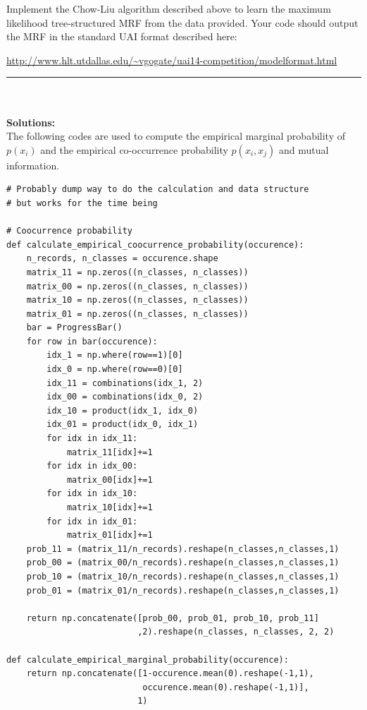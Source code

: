 \documentclass{article}
\begin{document}
\begin{enumerate}

Implement the Chow-Liu algorithm described above to learn the maximum
likelihood tree-structured MRF from the data provided. Your code should output the MRF in the standard UAI format described here:
\begin{center}
\url{http://www.hlt.utdallas.edu/~vgogate/uai14-competition/modelformat.html}
\end{center}
\noindent\rule{14cm}{2pt}
\\
\\
\textbf{Solutions:}
\\
The following codes are used to compute the empirical marginal probability of $p(x_i)$ and the empirical co-occurrence probability  $p(x_i, x_j)$ and mutual information.
\begin{verbatim}
# Probably dump way to do the calculation and data structure
# but works for the time being

# Coocurrence probability
def calculate_empirical_coocurrence_probability(occurence):
    n_records, n_classes = occurence.shape
    matrix_11 = np.zeros((n_classes, n_classes))
    matrix_00 = np.zeros((n_classes, n_classes))
    matrix_10 = np.zeros((n_classes, n_classes))
    matrix_01 = np.zeros((n_classes, n_classes))
    bar = ProgressBar()
    for row in bar(occurence):
        idx_1 = np.where(row==1)[0]
        idx_0 = np.where(row==0)[0]
        idx_11 = combinations(idx_1, 2)
        idx_00 = combinations(idx_0, 2)
        idx_10 = product(idx_1, idx_0)
        idx_01 = product(idx_0, idx_1)
        for idx in idx_11:
            matrix_11[idx]+=1
        for idx in idx_00:
            matrix_00[idx]+=1
        for idx in idx_10:
            matrix_10[idx]+=1
        for idx in idx_01:
            matrix_01[idx]+=1
    prob_11 = (matrix_11/n_records).reshape(n_classes,n_classes,1)
    prob_00 = (matrix_00/n_records).reshape(n_classes,n_classes,1)
    prob_10 = (matrix_10/n_records).reshape(n_classes,n_classes,1)
    prob_01 = (matrix_01/n_records).reshape(n_classes,n_classes,1)
    
    return np.concatenate([prob_00, prob_01, prob_10, prob_11]
                          ,2).reshape(n_classes, n_classes, 2, 2)

def calculate_empirical_marginal_probability(occurence):
    return np.concatenate([1-occurence.mean(0).reshape(-1,1), 
                           occurence.mean(0).reshape(-1,1)], 
                          1)


\end{verbatim}
\end{enumerate}
\end{document}
